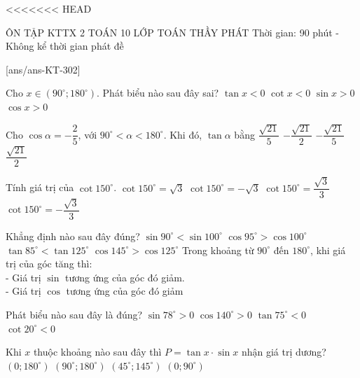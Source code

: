 <<<<<<< HEAD
\begin{name}
	{ÔN TẬP KTTX 2}
	{TOÁN 10}
	{LỚP TOÁN THẦY PHÁT}
	{Thời gian: 90 phút - Không kể thời gian phát đề}
\end{name}
\TN
\setcounter{ex}{0}\setcounter{ex}{0}
[ans/ans-KT-302]
\begin{ex} 
	Cho $x\in(90^\circ;180^\circ)$. Phát biểu nào sau đây sai?
	\choice
	{$\tan x<0$}
	{$\cot x<0$}
	{$\sin x>0$}
	{\True $\cos x>0$}
\end{ex}
\begin{ex}
	Cho $\cos\alpha=-\dfrac{2}{5}$, với $90^\circ<\alpha<180^\circ$. Khi đó, $\tan\alpha$ bằng
	\choice
	{$\dfrac{\sqrt{21}}{5}$}
	{\True $-\dfrac{\sqrt{21}}{2}$}
	{$-\dfrac{\sqrt{21}}{5}$}
	{$\dfrac{\sqrt{21}}{2}$}
\end{ex}
\begin{ex}
	Tính giá trị của $\cot150^\circ$.
	\choice
	{$\cot150^\circ=\sqrt{3}$}
	{\True $\cot150^\circ=-\sqrt{3}$}
	{$\cot150^\circ=\dfrac{\sqrt{3}}{3}$}
	{$\cot150^\circ=-\dfrac{\sqrt{3}}{3}$}
\end{ex}
\begin{ex}
	Khẳng định nào sau đây đúng?
	\choice
	{$\sin 90^\circ<\sin 100^\circ$}
	{\True $\cos 95^\circ>\cos 100^\circ$}
	{$\tan 85^\circ<\tan 125^\circ$}
	{$\cos 145^\circ>\cos 125^\circ$}
	\loigiai
	{Trong khoảng từ $90^\circ$ đến $180^\circ$, khi giá trị của góc tăng thì:\\
		- Giá trị $\sin$ tương ứng của góc đó giảm.\\
		- Giá trị $\cos$ tương ứng của góc đó giảm}
\end{ex}
\begin{ex}
	Phát biểu nào sau đây là đúng?
	\choice
	{\True $\sin78^\circ>0$}
	{$\cos 140^\circ>0$}
	{$\tan75^\circ<0$}
	{ $\cot20^\circ<0$}
\end{ex}
\begin{ex} 
	Khi $x$ thuộc khoảng nào sau đây thì $P=\tan x\cdot\sin x$ nhận giá trị dương?
	\choice
	{$\left(0;180^\circ\right)$}
	{$\left(90^\circ;180^\circ\right)$}
	{$\left(45^\circ;145^\circ\right)$}
	{\True $\left(0;90^\circ\right)$}
\end{ex}
